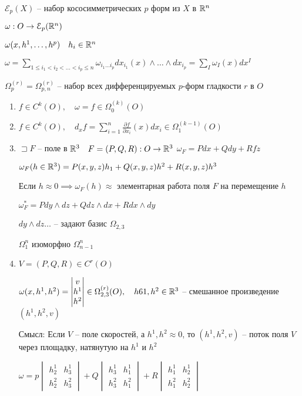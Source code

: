 \begin{note}
    [Напоминание]

    $\mathcal E_p(X)$ -- набор кососимметрических $p$ форм из $X$ в $\mathbb{R}^n$

    $\omega: O \to \mathcal E_p(\mathbb{R}^n)$

    $\omega(x, h^1, \ldots, h^p)\quad h_i\in \mathbb{R}^n$

    $\omega = \sum_{1\leqslant i_1 < i_2 < \ldots < i_p \leqslant n}\omega_{i_1\ldots i_p}dx_{i_1}(x) \wedge \ldots \wedge dx_{i_p} = \sum_I \omega_I(x)dx^I$

    $\Omega_p^{(r)} = \Omega_{p,n}^{(r)}$ -- набор всех дифференцируемых $p$-форм гладкости $r$ в $O$
\end{note}

\begin{example}
    \begin{enumerate}
        \item $f\in C^k(O),\quad \omega = f\in \Omega_0^{(k)}(O)$
        \item $f \in C^k(O),\quad d_xf = \sum_{i=1}^n \frac{\partial f}{\partial x_i}(x)dx_i\in \Omega_1^{(k-1)}(O)$
        \item $\sqsupset F$ -- поле в $\mathbb{R}^3\quad F = (P,Q,R):O \to \mathbb{R}^3$
        $\omega_F = Pdx + Qdy + Rfz$

        $\omega_F(h\in \mathbb{R}^3) = P(x,y,z) h_1 + Q(x,y,z)h^2 + R(x,y,z)h^3$

        Если $h \approx 0 \implies \omega_F(h)\approx$ элементарная работа поля $F$ на перемещение $h$ 

        $\omega_F^* = Pdy\wedge dz + Qdz\wedge dx + Rdx\wedge dy$

        $dy\wedge dz \ldots$ -- задают базис $\Omega_{2,3}$

        $\Omega_1^n $ изоморфно $\Omega_{n-1}^n$
        \item $V = (P,Q,R) \in C^r(O)$ 
        
        $\omega(x,h^1,h^2) = \begin{vmatrix}
            v\\h^1\\h^2
        \end{vmatrix}\in \Omega_{2,3}^{(r)}(O),\quad h61,h^2\in \mathbb{R}^3$ -- смешанное произведение $(h^1,h^2,v)$

        Смысл: Если $V$ -- поле скоростей, а $h^1, h^2\approx 0$, то $\left( h^1,h^2,v \right) $ -- поток поля $V$ через площадку, натянутую на $h^1$ и $h^2$
        
        $\omega = p \begin{vmatrix}
            h_2^1 & h_3^1\\h_2^2 & h_3^2
        \end{vmatrix} + Q \begin{vmatrix}
            h_3^1 & h_1^1\\h_3^2 & h_1^2
        \end{vmatrix} + R \begin{vmatrix}
            h_1^1 & h_2^1\\
            h_1^2 & h_2^2
        \end{vmatrix}$


\end{enumerate}
\end{example}
